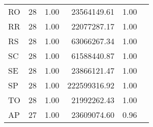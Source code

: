 \begin{tabular}{llrrrr}
RO &      28 &        1.00 &            23564149.61 &                  1.00 \\
RR &      28 &        1.00 &            22077287.17 &                  1.00 \\
RS &      28 &        1.00 &            63066267.34 &                  1.00 \\
SC &      28 &        1.00 &            61588440.87 &                  1.00 \\
SE &      28 &        1.00 &            23866121.47 &                  1.00 \\
SP &      28 &        1.00 &           222599316.92 &                  1.00 \\
TO &      28 &        1.00 &            21992262.43 &                  1.00 \\
AP &      27 &        1.00 &            23609074.60 &                  0.96 \\
\bottomrule
\end{tabular}

